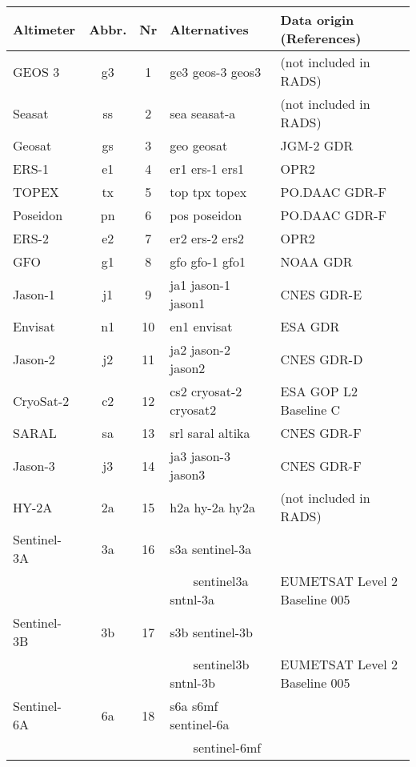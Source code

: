 \begin{table}
\begin{tabular}{lccll}
\hline
Altimeter & Abbr. & Nr & Alternatives & Data origin (References) \\
\hline
GEOS 3      & g3 &  1 & ge3 geos-3 geos3        & (not included in RADS) \\
Seasat      & ss &  2 & sea seasat-a            & (not included in RADS) \\
Geosat      & gs &  3 & geo geosat              & JGM-2 GDR \citep{cheney1991a} \\
ERS-1       & e1 &  4 & er1 ers-1 ers1          & OPR2 \citep{francis1990a,francis1991a} \\
TOPEX       & tx &  5 & top tpx topex           & PO.DAAC GDR-F \citep{rosmorduc2023} \\
Poseidon    & pn &  6 & pos poseidon            & PO.DAAC GDR-F \citep{rosmorduc2023} \\
ERS-2       & e2 &  7 & er2 ers-2 ers2          & OPR2 \citep{francis1995a} \\
GFO         & g1 &  8 & gfo gfo-1 gfo1          & NOAA GDR \\
Jason-1     & j1 &  9 & ja1 jason-1 jason1      & CNES GDR-E \citep{menard2003} \\
Envisat     & n1 & 10 & en1 envisat             & ESA GDR \\
Jason-2     & j2 & 11 & ja2 jason-2 jason2      & CNES GDR-D \citep{lambin2010} \\
CryoSat-2   & c2 & 12 & cs2 cryosat-2 cryosat2  & ESA GOP L2 Baseline C \citep{bouffard2015} \\
SARAL       & sa & 13 & srl saral altika        & CNES GDR-F \citep{bignalet2021} \\
Jason-3     & j3 & 14 & ja3 jason-3 jason3      & CNES GDR-F \\
HY-2A       & 2a & 15 & h2a hy-2a hy2a          & (not included in RADS) \\
Sentinel-3A & 3a & 16 & s3a sentinel-3a         &  \\
            &    &    & ~~~ sentinel3a sntnl-3a & EUMETSAT Level 2 Baseline 005 \\
Sentinel-3B & 3b & 17 & s3b sentinel-3b         &  \\
            &    &    & ~~~ sentinel3b sntnl-3b & EUMETSAT Level 2 Baseline 005 \\
Sentinel-6A & 6a & 18 & s6a s6mf sentinel-6a    &  \\
            &    &    & ~~~ sentinel-6mf   &  \\

\end{tabular}
\end{table}
